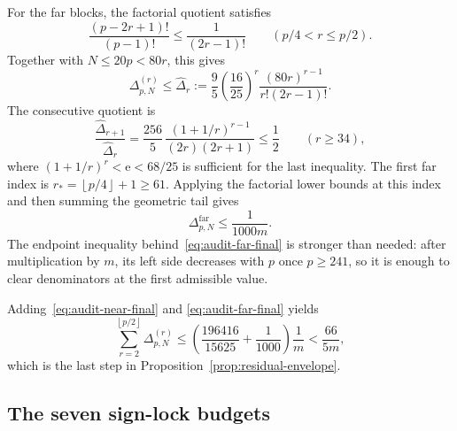 \documentclass[11pt]{article}
\theoremstyle{definition}
\theoremstyle{remark}
\newcommand{\floor}[1]{\left\lfloor #1\right\rfloor}
\begin{document}
For the far blocks, the factorial quotient satisfies
\[
 \frac{(p-2r+1)!}{(p-1)!}\le\frac1{(2r-1)!}
 \qquad(p/4<r\le p/2).
\]
Together with $N\le20p<80r$, this gives
\begin{equation}\label{eq:audit-far-term}
 \Delta_{p,N}^{(r)}\le
 \widehat\Delta_r:=
 \frac95\left(\frac{16}{25}\right)^r
 \frac{(80r)^{r-1}}{r!(2r-1)!}.
\end{equation}
The consecutive quotient is
\begin{equation}\label{eq:audit-far-ratio}
 \frac{\widehat\Delta_{r+1}}{\widehat\Delta_r}
 =\frac{256}{5}\,
   \frac{(1+1/r)^{r-1}}{(2r)(2r+1)}
 \le\frac12
 \qquad(r\ge34),
\end{equation}
where $(1+1/r)^r<\mathrm e<68/25$ is sufficient for the last
inequality.  The first far index is
$r_* =\floor{p/4}+1\ge61$.  Applying the factorial lower bounds at this
index and then summing the geometric tail gives
\begin{equation}\label{eq:audit-far-final}
 \Delta^{\mathrm{far}}_{p,N}\le\frac1{1000m}.
\end{equation}
The endpoint inequality behind~\eqref{eq:audit-far-final} is stronger than
needed: after multiplication by $m$, its left side decreases with $p$ once
$p\ge241$, so it is enough to clear denominators at the first admissible
value.

Adding~\eqref{eq:audit-near-final} and
\eqref{eq:audit-far-final} yields
\[
 \sum_{r=2}^{\floor{p/2}}\Delta_{p,N}^{(r)}
 \le\left(\frac{196416}{15625}+\frac1{1000}\right)\frac1m
 <\frac{66}{5m},
\]
which is the last step in Proposition~\ref{prop:residual-envelope}.

\subsection{The seven sign-lock budgets}
\end{document}
